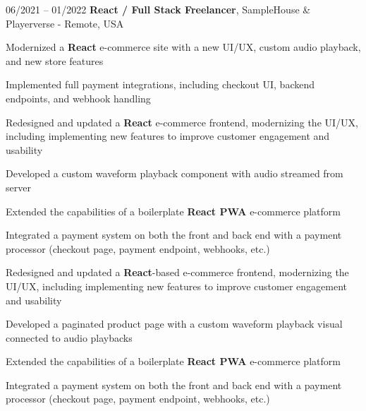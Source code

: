 

\begin{twocolentry}{
    06/2021 – 01/2022
}
\fontsize{11 pt}{11 pt}\textbf{React / Full Stack Freelancer}, SampleHouse \& Playerverse - Remote, USA\end{twocolentry}

\vspace{0.10 cm}
\begin{onecolentry}

    \ifcase\webFreelancingVariant
      \begin{highlights}
        \item Modernized a \textbf{React} e-commerce site with a new UI/UX, custom audio playback, and new store features
        \item Implemented full payment integrations, including checkout UI, backend endpoints, and webhook handling
      \end{highlights}
    \or
      \begin{highlights}
          \item Redesigned and updated a \textbf{React} e-commerce frontend, modernizing the UI/UX, including implementing new features to improve customer engagement and usability
          \item Developed a custom waveform playback component with audio streamed from server
          \item Extended the capabilities of a boilerplate \textbf{React PWA} e-commerce platform
          \item Integrated a payment system on both the front and back end with a payment processor (checkout page, payment endpoint, webhooks, etc.)
      \end{highlights}
    \else
      \begin{highlights}
        \item Redesigned and updated a \textbf{React}-based e-commerce frontend, modernizing the UI/UX, including implementing new features to improve customer engagement and usability
        \item Developed a paginated product page with a custom waveform playback visual connected to audio playbacks
        \item Extended the capabilities of a boilerplate \textbf{React PWA} e-commerce platform
        \item Integrated a payment system on both the front and back end with a payment processor (checkout page, payment endpoint, webhooks, etc.)
      \end{highlights}
    \fi

\end{onecolentry}

